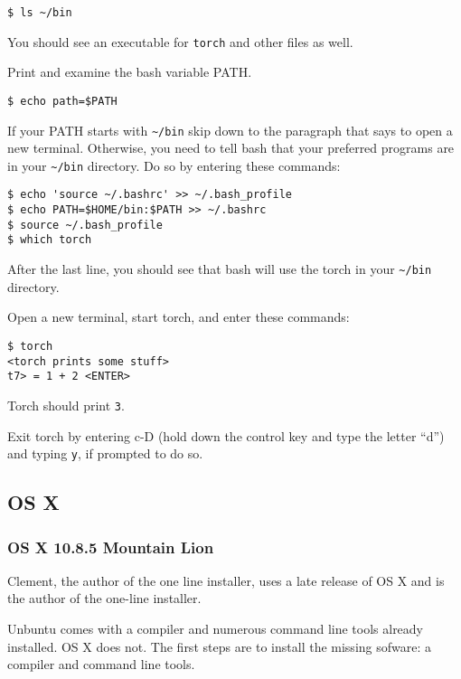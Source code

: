 \documentclass{article}
\let\code\texttt %
\begin{document}
\begin{verbatim}
$ ls ~/bin
\end{verbatim}

You should see an executable for \code{torch} and other files as well.

Print and examine the bash variable PATH.

\begin{verbatim}
$ echo path=$PATH
\end{verbatim}

If your PATH starts with \code{\textasciitilde/bin} skip down to the
paragraph that says to open a new terminal. Otherwise, you need to 
tell bash that your preferred programs are in your
\code{\textasciitilde/bin} directory. Do so by entering these commands:

\begin{verbatim}
$ echo 'source ~/.bashrc' >> ~/.bash_profile
$ echo PATH=$HOME/bin:$PATH >> ~/.bashrc
$ source ~/.bash_profile
$ which torch
\end{verbatim}

After the last line, you should see that bash will use the torch in your
\code{\textasciitilde/bin} directory.

Open a new terminal, start torch, and enter these commands:

\begin{verbatim}
$ torch
<torch prints some stuff>
t7> = 1 + 2 <ENTER>
\end{verbatim}

Torch should print \code{3}.

Exit torch by entering c-D (hold down the control key and type the
letter ``d'') and typing \code{y}, if prompted to do so.

\subsection{OS X}

\subsubsection{OS X 10.8.5 Mountain Lion}

Clement, the author of the one line installer,  uses a late release of OS X and is the author of the one-line
installer. 

Unbuntu comes with a compiler and numerous command line tools already
installed. OS X does not. The first steps are to install the missing
sofware: a compiler and command line tools.   
\end{document}
